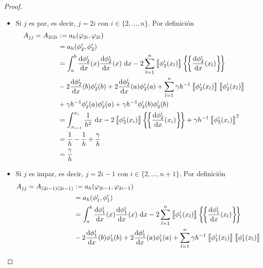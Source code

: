 \documentclass[10pt,a4paper]{report}
\newcommand{\dx}{\textup{d}x}
\providecommand{\Dx}[1]{\frac{\textup{d} #1}{\textup{d}x}}
\providecommand{\salto}[1]{\left\llbracket#1\right\rrbracket}
\providecommand{\prom}[1]{\left \{\!\left \{#1\right \}\!\right \}}
\begin{document}
\begin{proof}
\begin{itemize}
\begin{itemize}
\begin{align*}
                	                 &= \int_{x_{n}}^{x_{n+1}} \frac{1}{h^{2}}\ \dx  -2\phi^{n+1}_{2}(x_{n+1})\Dx{\phi^{n+1}_{2}}(x_{n+1})+ \gamma h^{-1}\phi^{n+1}_{2}(x_{n+1})\phi^{n+1}_{2}(x_{n+1})\\
                	                 &= \frac{1}{h} - \frac{2}{h} + \frac{\gamma}{h}\\
                	                 &= \frac{\gamma -1}{h}
                \end{align*}
        		\item Si $j$ es par, es decir, $j = 2i$ con $i\in\{2,\dots,n\}$. Por definición
        		\begin{align*}
        			A_{jj} = A_{2i 2i} &:= a_{h}(\varphi_{2i},\varphi_{2i})\\ 
        			                   &= a_{h}(\phi^{i}_{2},\phi^{i}_{2})\\
        			                   &= \int_{a}^{b} \Dx{\phi^{i}_{2}}(x)\Dx{\phi^{i}_{2}}(x)\ \dx - 2\sum_{l=1}^{n}\salto{\phi^{i}_{2}(x_{l})}\prom{\Dx{\phi^{i}_{2}}(x_{l})}\\
        			                   &-2\Dx{\phi^{i}_{2}}(b)\phi^{i}_{2}(b) + 2\Dx{\phi^{i}_{2}}(a)\phi^{i}_{2}(a) + \sum_{l=1}^{n}\gamma h^{-1}\salto{\phi^{i}_{2}(x_{l})}\salto{\phi^{i}_{2}(x_{l})}\\
        			                   &+ \gamma h^{-1}\phi^{i}_{2}(a)\phi^{i}_{2}(a) + \gamma h^{-1}\phi^{i}_{2}(b)\phi^{i}_{2}(b)\\
        			                   &= \int_{x_{i-1}}^{x_{i}}\frac{1}{h^{2}}\ \dx -2\salto{\phi^{i}_{2}(x_{i})}\prom{\Dx{\phi^{i}_{2}}(x_{i})} +\gamma h^{-1}\salto{\phi^{i}_{2}(x_{i})}^{2} \\
        			                   &= \frac{1}{h} - \frac{1}{h} + \frac{\gamma}{h}\\
        			                   &= \frac{\gamma}{h}
        		\end{align*}
        		\item Si $j$ es impar, es decir, $j = 2i-1$ con $i\in\{2,\dots,n+1\}$. Por definición
        		\begin{align*}
        			A_{jj} = A_{(2i-1) (2i-1)} &:= a_{h}(\varphi_{2i-1},\varphi_{2i-1})\\ 
        			&= a_{h}(\phi^{i}_{1},\phi^{i}_{1})\\
        			&= \int_{a}^{b} \Dx{\phi^{i}_{1}}(x)\Dx{\phi^{i}_{1}}(x)\ \dx - 2\sum_{l=1}^{n}\salto{\phi^{i}_{1}(x_{l})}\prom{\Dx{\phi^{i}_{1}}(x_{l})}\\
        			&-2\Dx{\phi^{i}_{1}}(b)\phi^{i}_{1}(b) + 2\Dx{\phi^{i}_{1}}(a)\phi^{i}_{1}(a) + \sum_{l=1}^{n}\gamma h^{-1}\salto{\phi^{i}_{1}(x_{l})}\salto{\phi^{i}_{1}(x_{l})}\\

\end{align*}
\end{itemize}
\end{itemize}
\end{proof}
\end{document}
